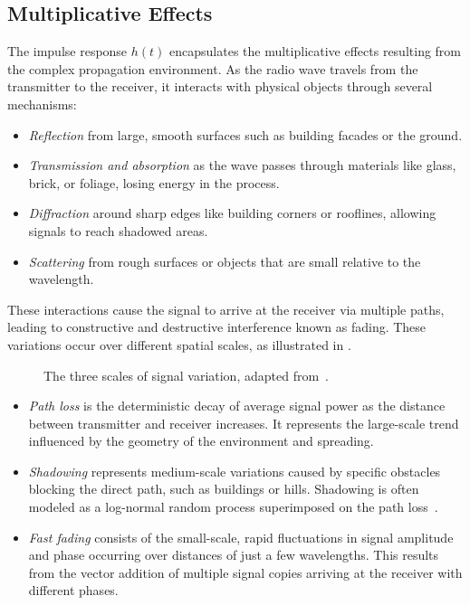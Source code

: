 \subsection{Multiplicative Effects}

The impulse response $h(t)$ encapsulates the multiplicative effects resulting from the complex propagation environment. As the radio wave travels from the transmitter to the receiver, it interacts with physical objects through several mechanisms:
\begin{itemize}
  \item \emph{Reflection} from large, smooth surfaces such as building facades or the ground.
  \item \emph{Transmission and absorption} as the wave passes through materials like glass, brick, or foliage, losing energy in the process.
  \item \emph{Diffraction} around sharp edges like building corners or rooflines, allowing signals to reach shadowed areas.
  \item \emph{Scattering} from rough surfaces or objects that are small relative to the \gls{wavelength}.
\end{itemize}

These interactions cause the signal to arrive at the receiver via multiple paths, leading to constructive and destructive interference known as fading. These variations occur over different spatial scales, as illustrated in .

\begin{figure}
  \centering
  \caption{The three scales of signal variation, adapted from~\cite[Fig.~1.5]{Saunders2024}.}
\end{figure}

\begin{itemize}
  \item \emph{Path loss} is the deterministic decay of average signal power as the distance between transmitter and receiver increases. It represents the large-scale trend influenced by the geometry of the environment and  spreading.
  \item \emph{Shadowing} represents medium-scale variations caused by specific obstacles blocking the direct path, such as buildings or hills. Shadowing is often modeled as a log-normal random process superimposed on the path loss~.
  \item \emph{Fast fading} consists of the small-scale, rapid fluctuations in signal amplitude and phase occurring over distances of just a few \glspl{wavelength}. This results from the vector addition of multiple signal copies arriving at the receiver with different phases.
\end{itemize}

